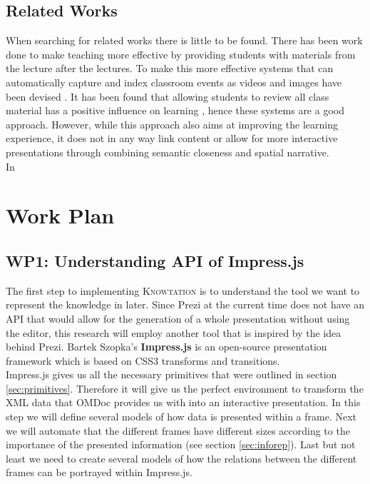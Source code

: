 \documentclass[twoside]{article}
\newcommand{\sys}{\textsc{Knowtation}\xspace}
\begin{document}
\subsection{Related Works}
\label{sec:relatedworks}

When searching for related works there is little to be found. There has been work done to make teaching more effective by providing students with materials from the lecture after the lectures. To make this more effective systems that can automatically capture and index classroom events as videos and images have been devised \cite{indexedclass:npentrel14}. It has been found that allowing students to review all class material has a positive influence on learning \cite{DBLP:dblp_journals/tochi/BrothertonA04}, hence these systems are a good approach. However, while this approach also aims at improving the learning experience, it does not in any way link content or allow for more interactive presentations through combining semantic closeness and spatial narrative.\\

In

\section{Work Plan}
\label{sec:workplan}

\subsection{WP1: Understanding API of Impress.js}
\label{sec:wp1}

The first step to implementing \sys is to understand the tool we want to represent the knowledge in later. Since Prezi at the current time does not have an API that would allow for the generation of a whole presentation without using the editor, this research will employ another tool that is inspired by the idea behind Prezi. Bartek Szopka's \textbf{Impress.js} \cite{JSImpress:npentrel14} is an open-source presentation framework which is based on CSS3 transforms and transitions.\\

Impress.js gives us all the necessary primitives that were outlined in section \ref{sec:primitives}. Therefore it will give us the perfect environment to transform the XML data that OMDoc provides us with into an interactive presentation. In this step we will define several models of how data is presented within a frame. Next we will automate that the different frames have different sizes according to the importance of the presented information (see section \ref{sec:inforep}). Last but not least we need to create several models of how the relations between the different frames can be portrayed within Impress.js.\\
\end{document}
